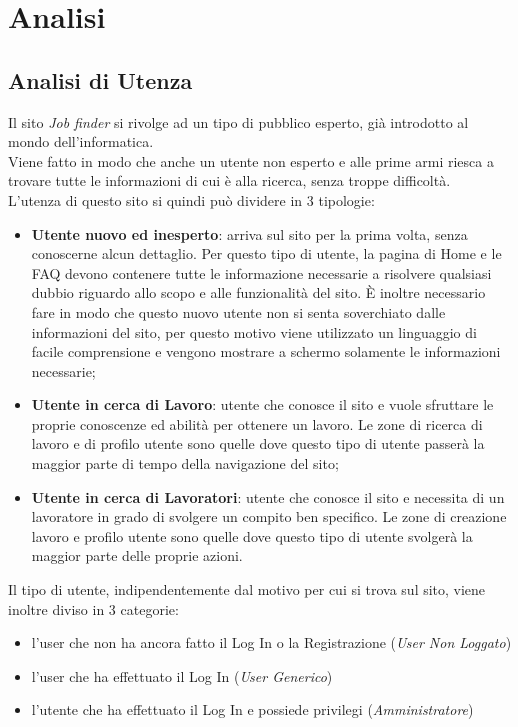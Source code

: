 \section{Analisi}
  \subsection{Analisi di Utenza}	
	  Il sito \textit{Job finder} si rivolge ad un tipo di pubblico esperto, già introdotto al mondo dell’informatica. \\
    Viene fatto in modo che anche un utente non esperto e alle prime armi riesca a trovare tutte le informazioni di cui è alla ricerca, senza troppe difficoltà.\\	
    L’utenza di questo sito si quindi può dividere in 3 tipologie:
	  \begin{itemize}
      \item \textbf{Utente nuovo ed inesperto}: arriva sul sito per la prima volta, senza conoscerne alcun dettaglio. Per questo tipo di utente, la pagina di Home e le FAQ devono contenere tutte 
      le informazione necessarie a risolvere qualsiasi dubbio riguardo allo scopo e alle funzionalità del sito. È inoltre necessario fare in modo che questo nuovo utente non si
      senta soverchiato dalle informazioni del sito, per questo motivo viene utilizzato un linguaggio di facile comprensione e vengono mostrare a schermo solamente le 
      informazioni necessarie;
      \item \textbf{Utente in cerca di Lavoro}: utente che conosce il sito e vuole sfruttare le proprie conoscenze ed abilità per ottenere un lavoro. Le zone di ricerca di lavoro e di profilo utente 
      sono quelle dove questo tipo di utente passerà la maggior parte di tempo della navigazione del sito;
      \item \textbf{Utente in cerca di Lavoratori}: utente che conosce il sito e necessita di un lavoratore in grado di svolgere un compito ben specifico. Le zone di creazione lavoro 
      e profilo utente sono quelle dove questo tipo di utente svolgerà la maggior parte delle proprie azioni.
    \end{itemize}
    Il tipo di utente, indipendentemente dal motivo per cui si trova sul sito, viene inoltre diviso in 3 categorie:
    \begin{itemize} 
      \item l’user che non ha ancora fatto il Log In o la Registrazione (\textit{User Non Loggato})
      \item l’user che ha effettuato il Log In (\textit{User Generico}) 
      \item l’utente che ha effettuato il Log In e possiede privilegi (\textit{Amministratore})
    \end{itemize}

